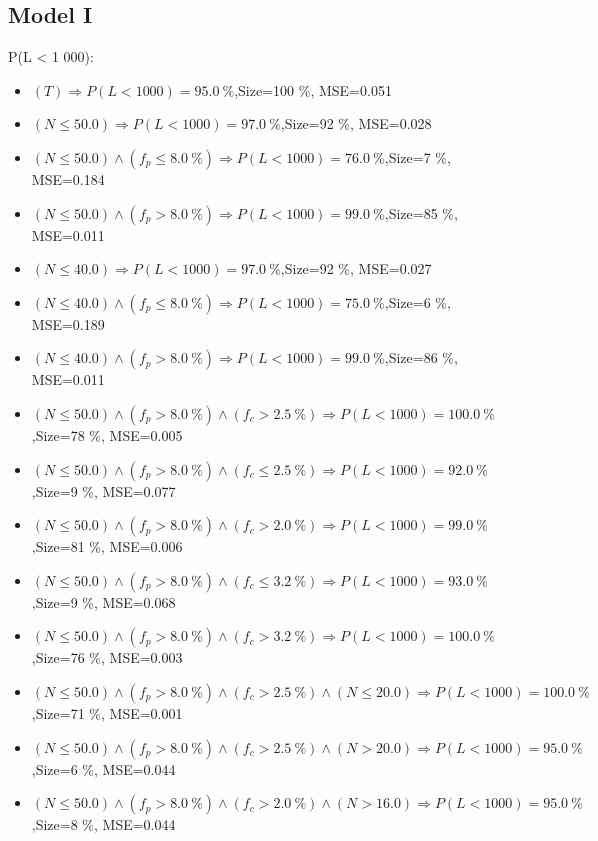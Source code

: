 \documentclass[numbered]{CSL}
\begin{document}
\subsection{Model I}
P(L < 1 000):
\begin{itemize}
\item $(T) \Rightarrow P(L < 1 000) = 95.0~\%$,\hfill Size=100 \%, MSE=0.051
\item $(N \leq 50.0) \Rightarrow P(L < 1 000) = 97.0~\%$,\hfill Size=92 \%, MSE=0.028
\item $(N \leq 50.0) \land (f_p \leq 8.0~\%) \Rightarrow P(L < 1 000) = 76.0~\%$,\hfill Size=7 \%, MSE=0.184
\item $(N \leq 50.0) \land (f_p > 8.0~\%) \Rightarrow P(L < 1 000) = 99.0~\%$,\hfill Size=85 \%, MSE=0.011
\item $(N \leq 40.0) \Rightarrow P(L < 1 000) = 97.0~\%$,\hfill Size=92 \%, MSE=0.027
\item $(N \leq 40.0) \land (f_p \leq 8.0~\%) \Rightarrow P(L < 1 000) = 75.0~\%$,\hfill Size=6 \%, MSE=0.189
\item $(N \leq 40.0) \land (f_p > 8.0~\%) \Rightarrow P(L < 1 000) = 99.0~\%$,\hfill Size=86 \%, MSE=0.011
\item $(N \leq 50.0) \land (f_p > 8.0~\%) \land (f_c > 2.5~\%) \Rightarrow P(L < 1 000) = 100.0~\%$,\hfill Size=78 \%, MSE=0.005
\item $(N \leq 50.0) \land (f_p > 8.0~\%) \land (f_c \leq 2.5~\%) \Rightarrow P(L < 1 000) = 92.0~\%$,\hfill Size=9 \%, MSE=0.077
\item $(N \leq 50.0) \land (f_p > 8.0~\%) \land (f_c > 2.0~\%) \Rightarrow P(L < 1 000) = 99.0~\%$,\hfill Size=81 \%, MSE=0.006
\item $(N \leq 50.0) \land (f_p > 8.0~\%) \land (f_c \leq 3.2~\%) \Rightarrow P(L < 1 000) = 93.0~\%$,\hfill Size=9 \%, MSE=0.068
\item $(N \leq 50.0) \land (f_p > 8.0~\%) \land (f_c > 3.2~\%) \Rightarrow P(L < 1 000) = 100.0~\%$,\hfill Size=76 \%, MSE=0.003
\item $(N \leq 50.0) \land (f_p > 8.0~\%) \land (f_c > 2.5~\%) \land (N \leq 20.0) \Rightarrow P(L < 1 000) = 100.0~\%$,\hfill Size=71 \%, MSE=0.001
\item $(N \leq 50.0) \land (f_p > 8.0~\%) \land (f_c > 2.5~\%) \land (N > 20.0) \Rightarrow P(L < 1 000) = 95.0~\%$,\hfill Size=6 \%, MSE=0.044
\item $(N \leq 50.0) \land (f_p > 8.0~\%) \land (f_c > 2.0~\%) \land (N > 16.0) \Rightarrow P(L < 1 000) = 95.0~\%$,\hfill Size=8 \%, MSE=0.044

\end{itemize}
\end{document}

